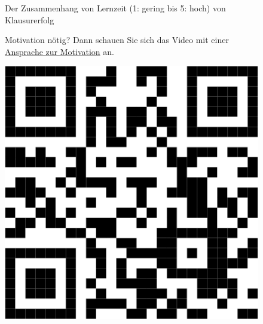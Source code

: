 \documentclass[
  letterpaper,
  twoside,
  open=any]{scrbook}
\theoremstyle{definition}
\theoremstyle{definition}
\theoremstyle{definition}
\theoremstyle{remark}
\begin{document}
\begin{figure}


\caption{\label{fig-lernen}Der Zusammenhang von Lernzeit (1: gering bis
5: hoch) von Klausurerfolg}

\end{figure}%

\begin{figure}

\begin{minipage}{0.80\linewidth}
Motivation nötig? Dann schauen Sie sich das Video mit einer
\href{https://youtu.be/jtNlzpcPr5Y}{Ansprache zur Motivation}
an.\end{minipage}%
%
\begin{minipage}{0.20\linewidth}

\begin{center}
\includegraphics[width=0.75\linewidth,height=\textheight,keepaspectratio]{005-orga_files/figure-pdf/unnamed-chunk-2-1.pdf}
\end{center}

\end{minipage}%

\end{figure}%
\end{document}
